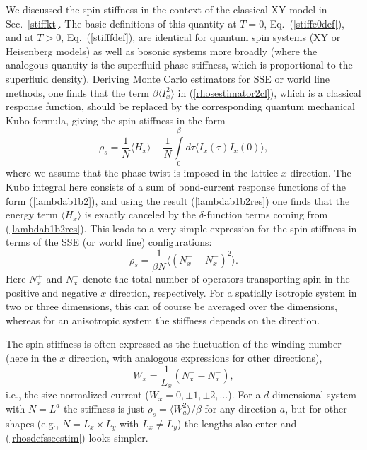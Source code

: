 \documentclass[draft,numberedheadings]{aipproc}
\begin{document}
We discussed the spin stiffness in the context of the classical  XY model in Sec.~\ref{stiffkt}. The basic definitions of this quantity at $T=0$, 
Eq.~(\ref{stiffe0def}), and at $T>0$, Eq.~(\ref{stifffdef}), are identical for quantum spin systems (XY or Heisenberg models) as well as bosonic systems 
more broadly (where the analogous quantity is the superfluid phase stiffness, which is proportional to the superfluid density). Deriving Monte Carlo 
estimators for SSE or world line methods, one finds that the term $\beta \langle I_x^2\rangle$ in (\ref{rhosestimator2cl}), which is a classical 
response function, should be replaced by the corresponding quantum mechanical Kubo formula, giving the spin stiffness in the form
\begin{equation}
\rho_s = \frac{1}{N}\langle H_x\rangle - \frac{1}{N}\int\limits_0^\beta d\tau \langle I_x(\tau)I_x(0)\rangle,
\label{rhosdefsse}
\end{equation}
where we assume that the phase twist is imposed in the lattice $x$ direction. The Kubo integral here consists of a sum of bond-current response functions 
of the form (\ref{lambdab1b2}), and using the result (\ref{lambdab1b2res}) one finds that the energy term $\langle H_x\rangle$ is exactly canceled 
by the $\delta$-function terms coming from (\ref{lambdab1b2res}). This leads to a very simple expression for the spin stiffness in terms of the SSE
(or world line) configurations:
\begin{equation}
\rho_s = \frac{1}{\beta N}\langle (N^+_x-N^-_x)^2\rangle .
\label{rhosdefsseestim}
\end{equation}
Here $N^+_x$ and $N^-_x$ denote the total number of operators transporting spin in the positive and negative $x$ direction, respectively. For a spatially 
isotropic system in two or three dimensions, this can of course be averaged over the dimensions, whereas for an anisotropic system the stiffness depends 
on the direction. 

The spin stiffness is often expressed as the fluctuation of the winding number (here in the $x$ direction, with analogous expressions for other 
directions),
\begin{equation}
W_x = \frac{1}{L_x} (N^+_x-N^-_x),
\label{wxdef}
\end{equation}
i.e., the size normalized current ($W_x=0,\pm1,\pm2,\ldots$). For a $d$-dimensional system with $N=L^d$ the stiffness is just 
$\rho_s=\langle W^2_a\rangle/\beta$ for any direction $a$, but for other shapes (e.g., $N=L_x\times L_y$ with $L_x\not=L_y$) the lengths also 
enter and (\ref{rhosdefsseestim}) looks simpler.
\end{document}
